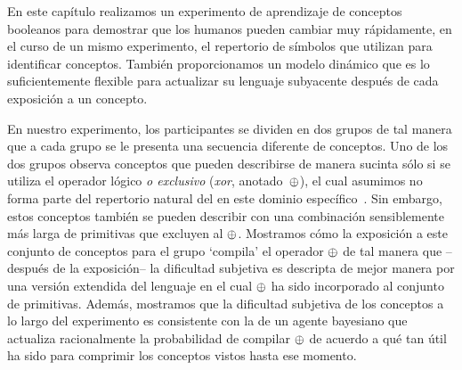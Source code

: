 En este capítulo realizamos un experimento de aprendizaje de conceptos booleanos para demostrar que los humanos pueden cambiar muy rápidamente, en el curso de un mismo experimento, el repertorio de símbolos que utilizan para identificar conceptos. También proporcionamos un modelo dinámico que es lo suficientemente flexible para actualizar su lenguaje subyacente después de cada exposición a un concepto.


En nuestro experimento, los participantes se dividen en dos grupos de tal manera que a cada grupo se le presenta una secuencia diferente de conceptos. Uno de los dos grupos observa conceptos que pueden describirse de manera sucinta sólo si se utiliza el operador lógico {\em o exclusivo} ({\em xor}, anotado~$\oplus$), el cual asumimos no forma parte del repertorio natural del \lot en este dominio específico~\cite{piantadosi2016logical}. Sin embargo, estos conceptos también se pueden describir con una combinación sensiblemente más larga de primitivas que excluyen al $\oplus$. Mostramos cómo la exposición a este conjunto de conceptos para el grupo `compila' el operador $\oplus$ de tal manera que --después de la exposición-- la dificultad subjetiva es descripta de mejor manera por una versión extendida del lenguaje en el cual $\oplus$ ha sido incorporado al conjunto de primitivas. Además, mostramos que la dificultad subjetiva de los conceptos a lo largo del experimento es consistente con la de un agente bayesiano que actualiza racionalmente la probabilidad de compilar $\oplus$ de acuerdo a qué tan útil ha sido para comprimir los conceptos vistos hasta ese momento.

